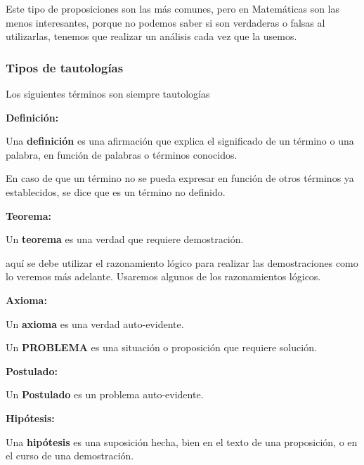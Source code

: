 Este tipo de proposiciones son las más comunes, pero en Matemáticas
son las menos interesantes, porque no podemos saber si son verdaderas
o falsas al utilizarlas, tenemos que realizar un análisis cada vez
que la usemos.

\subsubsection{Tipos de tautologías}

Los siguientes términos son siempre tautologías

\vspace*{-100pt}\begin{ideabox}{\bf Definición:} 

Una \textbf{definición} es una afirmación que explica el significado
de un término o una palabra, en función de palabras o términos conocidos.

\end{ideabox}

En caso de que un término no se pueda expresar en función de otros
términos ya establecidos, se dice que es un término no definido. 

\vspace*{-100pt}\begin{ideabox}{\bf Teorema:}

Un \textbf{teorema} es una verdad que requiere demostración. \end{ideabox} 

aquí se debe utilizar el razonamiento lógico para realizar las demostraciones
como lo veremos más adelante. Usaremos algunos de los razonamientos
lógicos.

\vspace*{-80pt}\begin{ideabox}{\bf Axioma:}

Un \textbf{axioma} es una verdad auto-evidente. \end{ideabox} 

Un \textbf{PROBLEMA} es una situación o proposición que requiere solución. 

\vspace*{-80pt}\begin{ideabox}{\bf Postulado:}

Un \textbf{Postulado} es un problema auto-evidente. \end{ideabox} 

\vspace*{-80pt}\begin{ideabox}{\bf Hipótesis:}

Una \textbf{hipótesis} es una suposición hecha, bien en el texto de
una proposición, o en el curso de una demostración. \end{ideabox} 

